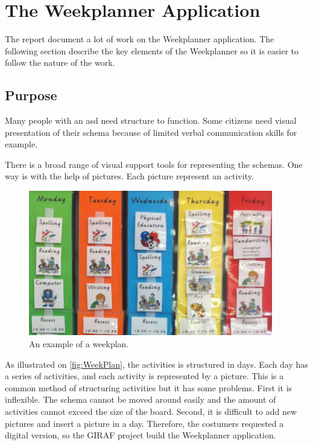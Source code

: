 \section{The Weekplanner Application}\label{sec:TheWeekplannerApplication}

The report document a lot of work on the Weekplanner application. The following section describe the key elements of the Weekplanner so it is easier to follow the nature of the work.

\subsection{Purpose}
Many people with an \gls{asd} need structure to function. Some \glspl{citizen} need visual presentation\cite{VisualSupport} of their schema because of limited verbal communication skills for example. 

There is a broad range of visual support tools for representing the schemas. One way is with the help of pictures. Each picture represent an activity.

\begin{figure}[H]
    \begin{center}
        \includegraphics[width=0.95\textwidth]{figures/WeekPlanEks.png}
    \end{center}
    \caption{An example of a weekplan.\cite{VisualSupport}}
    \label{fig:WeekPlan}
\end{figure}

As illustrated on \autoref{fig:WeekPlan}, the activities is structured in days. Each day has a series of activities, and each activity is represented by a picture.
This is a common method of structuring activities but it has some problems. First it is inflexible. The schema cannot be moved around easily and the amount of activities cannot exceed the size of the board. Second, it is difficult to add new pictures and insert a picture in a day. 
Therefore, the costumers requested a digital version, so the GIRAF project build the Weekplanner application.

